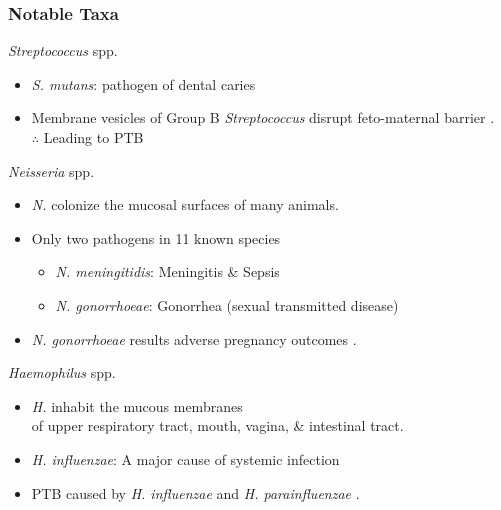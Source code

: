 \documentclass{beamer}
\begin{document}
    \begin{frame}[allowframebreaks]
        \frametitle{Notable Taxa}

        \begin{block}{\textit{Streptococcus} spp.}
            \begin{itemize}
                \item \textit{S. mutans}: pathogen of dental caries
                \item Membrane vesicles of Group B \textit{Streptococcus} disrupt feto-maternal barrier \cite{streptococcus-1}. \\
                    $\therefore$ Leading to PTB
            \end{itemize}
        \end{block}

        \begin{block}{\textit{Neisseria} spp.}
            \begin{itemize}
                \item \textit{N.} colonize the mucosal surfaces of many animals.
                \item Only two pathogens in 11 known species
                    \begin{itemize}
                        \item \textit{N. meningitidis}: Meningitis \& Sepsis
                        \item \textit{N. gonorrhoeae}: Gonorrhea (sexual transmitted disease)
                    \end{itemize}
                \item \textit{N. gonorrhoeae} results adverse pregnancy outcomes \cite{neisseria-1}.
            \end{itemize}
        \end{block}

        \begin{block}{\textit{Haemophilus} spp.}
            \begin{itemize}
                \item \textit{H.} inhabit the mucous membranes \\
                    of upper respiratory tract, mouth, vagina, \& intestinal tract.
                \item \textit{H. influenzae}: A major cause of systemic infection
                \item PTB caused by \textit{H. influenzae} \cite{haemophilus-1} and \textit{H. parainfluenzae} \cite{haemophilus-2}.
            \end{itemize}
        \end{block}


\end{frame}
\end{document}
